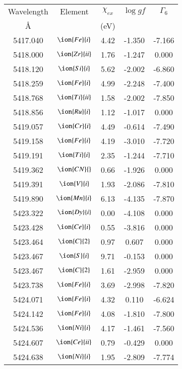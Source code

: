 \documentclass[fleqn,usenatbib]{mnras}
\begin{document}
 \begin{center}
 \begin{table}
 \begin{tabular}{ccccc}
 \hline
 Wavelength & Element & $\chi_{ex}$ &  $\log gf$ & $\varGamma_{6}$ \\
   \AA{}    &         &  (eV)       &            &                  \\
 \hline
5417.040 &  $\ion{Fe}{i}$  & 4.42 & -1.350 & -7.166 \\ 
5418.000 &  $\ion{Zr}{ii}$  & 1.76 & -1.247 & 0.000 \\ 
5418.120 &  $\ion{Si}{i}$  & 5.62 & -2.002 & -6.860 \\ 
5418.259 &  $\ion{Fe}{i}$  & 4.99 & -2.248 & -7.400 \\ 
5418.768 &  $\ion{Ti}{ii}$  & 1.58 & -2.002 & -7.850 \\ 
5418.856 &  $\ion{Ru}{i}$  & 1.12 & -1.017 & 0.000 \\ 
5419.057 &  $\ion{Cr}{i}$  & 4.49 & -0.614 & -7.490 \\ 
5419.158 &  $\ion{Fe}{i}$  & 4.19 & -3.010 & -7.720 \\ 
5419.191 &  $\ion{Ti}{i}$  & 2.35 & -1.244 & -7.710 \\ 
5419.362 & $\ion{CN}{}$ & 0.66 & -1.926 & 0.000 \\ 
5419.391 &  $\ion{V}{i}$  & 1.93 & -2.086 & -7.810 \\ 
5419.890 &  $\ion{Mn}{i}$  & 6.13 & -4.135 & -7.870 \\ 
5423.322 &  $\ion{Dy}{i}$  & 0.00 & -4.108 & 0.000 \\ 
5423.428 &  $\ion{Ce}{i}$  & 0.55 & -3.816 & 0.000 \\ 
5423.464 &  $\ion{C}{2}$ & 0.97 & 0.607 & 0.000 \\ 
5423.467 &  $\ion{S}{i}$  & 9.71 & -0.153 & 0.000 \\ 
5423.467 &  $\ion{C}{2}$ & 1.61 & -2.959 & 0.000 \\ 
5423.738 &  $\ion{Fe}{i}$  & 3.69 & -2.998 & -7.820 \\ 
5424.071 &  $\ion{Fe}{i}$  & 4.32 & 0.110 & -6.624 \\ 
5424.142 &  $\ion{Fe}{i}$  & 4.08 & -1.810 & -7.800 \\ 
5424.536 &  $\ion{Ni}{i}$  & 4.17 & -1.461 & -7.560 \\ 
5424.607 &  $\ion{Ce}{ii}$  & 0.79 & -0.429 & 0.000 \\ 
5424.638 &  $\ion{Ni}{i}$  & 1.95 & -2.809 & -7.774 \\ 

\end{tabular}
\end{table}
\end{center}
\end{document}
